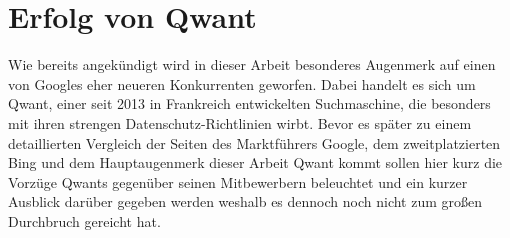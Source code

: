 \section{Erfolg von Qwant}\label{sec:qwant-erfolg}

Wie bereits angekündigt wird in dieser Arbeit besonderes Augenmerk auf einen von Googles eher neueren Konkurrenten
geworfen.
Dabei handelt es sich um Qwant, einer seit 2013 in Frankreich entwickelten Suchmaschine, die besonders mit ihren
strengen Datenschutz-Richtlinien wirbt.
Bevor es später zu einem detaillierten Vergleich der Seiten des Marktführers Google, dem zweitplatzierten Bing und dem
Hauptaugenmerk dieser Arbeit Qwant kommt sollen hier kurz die Vorzüge Qwants gegenüber seinen Mitbewerbern beleuchtet
und ein kurzer Ausblick darüber gegeben werden weshalb es dennoch noch nicht zum großen Durchbruch gereicht hat.


